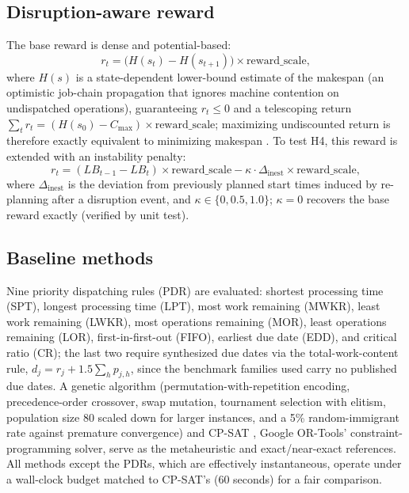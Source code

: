 \documentclass[11pt]{article}
\newcommand{\Cmax}{C_{\max}}
\begin{document}
\subsection{Disruption-aware reward}
\label{sec:reward}

The base reward is dense and potential-based:
\begin{equation}
r_t = \big(H(s_t) - H(s_{t+1})\big) \times \text{reward\_scale},
\end{equation}
where $H(s)$ is a state-dependent lower-bound estimate of the makespan (an optimistic job-chain propagation that ignores machine contention on undispatched operations), guaranteeing $r_t \le 0$ and a telescoping return $\sum_t r_t = (H(s_0) - \Cmax)\times\text{reward\_scale}$; maximizing undiscounted return is therefore exactly equivalent to minimizing makespan \citep{ng1999shaping}. To test H4, this reward is extended with an instability penalty:
\begin{equation}
r_t = (LB_{t-1} - LB_t)\times\text{reward\_scale} - \kappa\cdot\Delta_{\mathrm{inest}}\times\text{reward\_scale},
\end{equation}
where $\Delta_{\mathrm{inest}}$ is the deviation from previously planned start times induced by re-planning after a disruption event, and $\kappa\in\{0,0.5,1.0\}$; $\kappa=0$ recovers the base reward exactly (verified by unit test).

\subsection{Baseline methods}
\label{sec:baselines}

Nine priority dispatching rules (PDR) are evaluated: shortest processing time (SPT), longest processing time (LPT), most work remaining (MWKR), least work remaining (LWKR), most operations remaining (MOR), least operations remaining (LOR), first-in-first-out (FIFO), earliest due date (EDD), and critical ratio (CR); the last two require synthesized due dates via the total-work-content rule, $d_j = r_j + 1.5\sum_h p_{j,h}$, since the benchmark families used carry no published due dates. A genetic algorithm (permutation-with-repetition encoding, precedence-order crossover, swap mutation, tournament selection with elitism, population size 80 scaled down for larger instances, and a 5\% random-immigrant rate against premature convergence) and CP-SAT \citep{perron2023cpsat}, Google OR-Tools' constraint-programming solver, serve as the metaheuristic and exact/near-exact references. All methods except the PDRs, which are effectively instantaneous, operate under a wall-clock budget matched to CP-SAT's (60 seconds) for a fair comparison.
\end{document}
